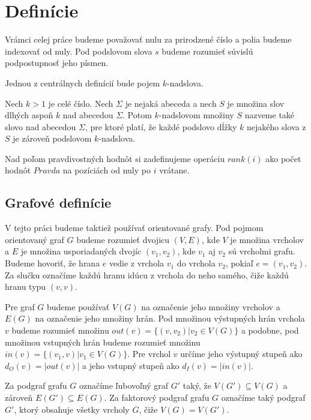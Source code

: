 \section{Definície}

Vrámci celej práce budeme považovať nulu za prirodzené číslo a polia budeme indexovať
od nuly. Pod podslovom slova $s$ budeme rozumieť súvislú podpostupnosť jeho písmen.

Jednou z centrálnych definícií bude pojem $k$-nadslova.

\begin{defn}
    Nech $k > 1$ je celé číslo. Nech $\Sigma$ je nejaká abeceda a nech $S$ je množina
    slov dlhých aspoň $k$ nad abecedou $\Sigma$. Potom $k$-nadslovom množiny $S$ nazveme také slovo
    nad abecedou $\Sigma$, pre ktoré platí, že každé podslovo dĺžky $k$ nejakého slova z $S$ je
    zároveň podslovom $k$-nadslova.
\end{defn}

Nad poľom pravdivostných hodnôt si zadefinujeme operáciu $rank(i)$ ako počet hodnôt $Pravda$
na pozíciách od nuly po $i$ vrátane.

\subsection{Grafové definície}

V tejto práci budeme taktiež používať orientované grafy. Pod pojmom orientovaný graf $G$ budeme
rozumieť dvojicu $(V, E)$, kde $V$ je množina vrcholov a $E$ je množina usporiadaných
dvojíc $(v_1, v_2)$, kde $v_1$ aj $v_2$ sú vrcholmi grafu. Budeme hovoriť, že hrana $e$ vedie
z vrchola $v_1$ do vrchola $v_2$, pokiaľ $e = (v_1, v_2)$. Za slučku označíme každú hranu idúcu z vrchola
do neho samého, čiže každú hranu typu $(v, v)$.

Pre graf $G$ budeme používať $V(G)$ na označenie jeho množiny vrcholov a $E(G)$ na označenie jeho
množiny hrán. Pod množinou výstupných hrán
vrchola $v$ budeme rozumieť množinu $out(v) = \{ (v, v_2) | v_2 \in V(G) \}$ a podobne,
pod množinou vstupných hrán budeme rozumieť množinu $in(v) = \{ (v_1, v) | v_1 \in V(G) \}$.
Pre vrchol $v$ určíme jeho výstupný stupeň ako $d_O(v) = |out(v)|$ a jeho vstupný stupeň ako $d_I(v) = |in(v)|$.

Za podgraf grafu $G$ označíme ľubovoľný graf $G'$ taký, že $V(G') \subseteq V(G)$ a zároveň $E(G') \subseteq E(G)$.
Za faktorový podgraf grafu $G$ označíme taký podgraf $G'$, ktorý obsahuje všetky vrcholy $G$, čiže
$V(G) = V(G')$.

